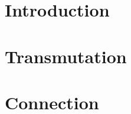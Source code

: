 \documentclass[paper=6in:9in,pagesize=pdftex,
 headinclude=off,footinclude=on,11pt,twoside]{scrbook}
\begin{document}

\setcounter{tocdepth}{1}
\tableofcontents
\chapter{Introduction}

\clearpage
\chapter{Transmutation}

\clearpage
\chapter{Connection}

\begin{comment}
\chapter{Sameness}


\clearpage
\chapter{Resource composition}


\clearpage
\chapter{Motion}


\clearpage
\chapter{Creating categories}


\clearpage

\chapter{Thinking about alternatives}

\clearpage

\chapter{Concepts of  Formal Engineering Design}



\end{comment}
\end{document}
